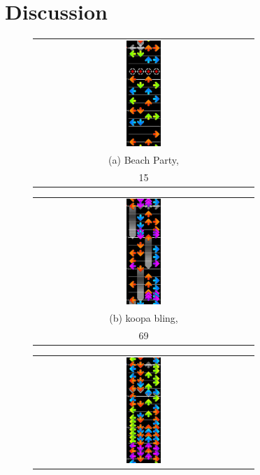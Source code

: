 \documentclass[10pt]{sigplanconf}
\begin{document}

\section{Discussion}

\begin{figure}[t]
	\begin{center}
	\begin{tabular}{c}
		\includegraphics[width=0.16\textwidth]{disco-beachparty.png}
		\\
		(a) Beach Party, \\ 15 \cite{beachparty} %
	\end{tabular}
	\begin{tabular}{c}
		\includegraphics[width=0.16\textwidth]{disco-koopa.png}
		\\
		(b) koopa bling, \\ 69 \cite{koopa} %
	\end{tabular}
	\begin{tabular}{c}
		\includegraphics[width=0.16\textwidth]{disco-zombiesunet.png}

\end{tabular}
\end{center}
\end{figure}
\end{document}
